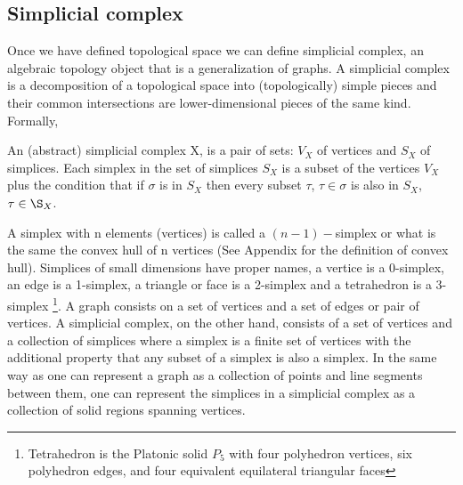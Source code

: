 \documentclass[onecollarge,runningheads]{svjour2}
\begin{document}
\subsection{Simplicial complex} 

Once we have defined topological space we can define simplicial complex, an algebraic topology object that is a generalization of graphs. A simplicial complex is a decomposition of a topological space into (topologically) simple pieces and their common intersections are lower-dimensional pieces of the same kind. 
Formally, 
\begin{definition}
An (abstract) simplicial complex X, is a pair of sets: $V_X$ of vertices and $S_X$ of simplices. Each simplex in the set of simplices $S_X$ is a subset of the vertices $V_X$ plus the condition that if $\sigma$ is in $S_X$ then every subset $\tau$, $\tau \in \sigma$ is also in $S_X$, $\tau \in \S_X$. 
\end{definition}

\begin{example}
\end{example}

A simplex with n elements (vertices) is called a $(n-1)-$simplex or what is the same the convex hull of n vertices (See Appendix for the definition of convex hull). Simplices of small dimensions have proper names, a vertice is a 0-simplex, an edge is a 1-simplex, a triangle or face is a 2-simplex and a tetrahedron is a 3-simplex \footnote{Tetrahedron is the Platonic solid $P_5$ with four polyhedron vertices, six polyhedron edges, and four equivalent equilateral triangular faces}. 
A graph consists on a set of vertices and a set of edges or pair of vertices. A simplicial complex, on the other hand, consists of a set of vertices and a collection of simplices where a simplex is a finite set of vertices with the additional property that any subset of a simplex is also a simplex. In the same way as one can represent a graph as a collection of points and line segments between them, one can represent the simplices in a simplicial complex as a collection of solid regions spanning vertices.
\end{document}
